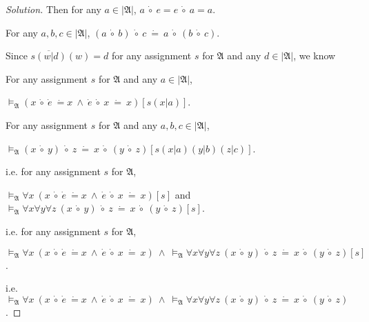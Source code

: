 \documentclass{article}
\newenvironment{solution}{\begin{proof}[\noindent\it Solution]}{\end{proof}}
\begin{document}
\begin{solution}
    \hspace{7.7em}
    Then for any $a\in|\mathfrak{A}|$, $a\ \dot{\circ}\ e = e\ \dot{\circ}\ a = a.$

    \hspace{10.3em}
    For any $a,b,c\in|\mathfrak{A}|$, $\left(a\ \dot{\circ}\ b\right)\ \dot{\circ}\  c\ \dot{=}\ a\ \dot{\circ}\ \left(b\  \dot{\circ}\ c\right)$.

    \hspace{7.7em}
    Since $\overline{s(w|d)}(w)=d$ for any assignment $s$ for $\mathfrak{A}$ and any $d\in|\mathfrak{A}|$, we know

    \hspace{10.3em}
    For any assignment $s$ for $\mathfrak{A}$ and any $a\in|\mathfrak{A}|$, 
    
    \hspace{16em}
    $\vDash_{\mathfrak{A}} (x\ \dot{\circ}\ \dot{e}\ \dot{=}x\ \land\ \dot{e}\ \dot{\circ}\ x\ \dot{=}\ x) [s(x|a)]$.

    \hspace{10.3em}
    For any assignment $s$ for $\mathfrak{A}$ and any $a,b,c\in|\mathfrak{A}|$, 
    
    \hspace{16em}
    $\vDash_{\mathfrak{A}} \left(x\ \dot{\circ}\ y\right)\ \dot{\circ}\  z\ \dot{=}\ x\ \dot{\circ}\ \left(y\  \dot{\circ}\ z\right) [s(x|a)(y|b)(z|c)]$.

    \hspace{7.7em}
    i.e. for any assignment $s$ for $\mathfrak{A}$, 
    
    \hspace{9em}
    $\vDash_\mathfrak{A}\forall x\ (x\ \dot{\circ}\ \dot{e}\ \dot{=}x\ \land\ \dot{e}\ \dot{\circ}\ x\ \dot{=}\ x) [s]$ and $\vDash_\mathfrak{A} \forall x\forall y\forall z\ \left(x\ \dot{\circ}\ y\right)\ \dot{\circ}\  z\ \dot{=}\ x\ \dot{\circ}\ \left(y\  \dot{\circ}\ z\right)[s]$.

    \hspace{7.7em}
    i.e. for any assignment $s$ for $\mathfrak{A}$, 
    
    \hspace{10em}
    $\vDash_\mathfrak{A}\forall x\ (x\ \dot{\circ}\ \dot{e}\ \dot{=}x\ \land\ \dot{e}\ \dot{\circ}\ x\ \dot{=}\ x)\ \land\ \vDash_\mathfrak{A} \forall x\forall y\forall z\ \left(x\ \dot{\circ}\ y\right)\ \dot{\circ}\  z\ \dot{=}\ x\ \dot{\circ}\ \left(y\  \dot{\circ}\ z\right) [s]$.

    \hspace{2.6em}
    i.e. $\vDash_\mathfrak{A}\forall x\ (x\ \dot{\circ}\ \dot{e}\ \dot{=}x\ \land\ \dot{e}\ \dot{\circ}\ x\ \dot{=}\ x)\ \land\ \vDash_\mathfrak{A} \forall x\forall y\forall z\ \left(x\ \dot{\circ}\ y\right)\ \dot{\circ}\  z\ \dot{=}\ x\ \dot{\circ}\ \left(y\  \dot{\circ}\ z\right)$. 
    

\end{solution}
\end{document}
